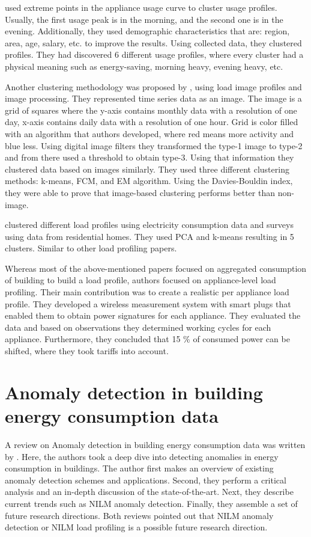 \cite{Jeong2021} used extreme points in the appliance usage curve to cluster usage profiles.
Usually, the first usage peak is in the morning, and the second one is in the evening. 
Additionally, they used demographic characteristics that are: region, area, age, salary, etc. to improve the results.
Using collected data, they clustered profiles. They had discovered 6 different usage profiles, 
where every cluster had a physical meaning such as energy-saving, morning heavy, evening heavy, etc.

Another clustering methodology was proposed by \cite{Park2019}, using load image profiles and image processing.
They represented time series data as an image. The image is a grid of squares where the y-axis contains monthly data with a resolution of one day,
x-axis contains daily data with a resolution of one hour. Grid is color filled with an algorithm that authors developed,
where red means more activity and blue less. Using digital image filters they transformed the type-1 image to type-2 and from there
used a threshold to obtain type-3. Using that information they clustered data based on images similarly. They used three different 
clustering methods: k-means, FCM, and EM algorithm. Using the Davies-Bouldin index, they were able to prove that image-based clustering performs better than non-image.

\cite{Joana2012} clustered different load profiles using electricity consumption data and surveys using data from residential homes.
They used PCA and k-means resulting in 5 clusters. Similar to other load profiling papers. 

Whereas most of the above-mentioned papers focused on aggregated consumption of building to build a load profile,
authors \cite{Issi2018} focused on appliance-level load profiling.
Their main contribution was to create a realistic per appliance load profile.
They developed a wireless measurement system with smart plugs that enabled them to obtain 
power signatures for each appliance. They evaluated the data and based on observations they determined working cycles for each appliance.
Furthermore, they concluded that 15 \% of consumed power can be shifted, where they took tariffs into account. 

\section{Anomaly detection in building energy consumption data}

A review on Anomaly detection in building energy consumption data was written by \cite{HIMEUR2021116601}.
Here, the authors took a deep dive into detecting anomalies in energy consumption in buildings. 
The author first makes an overview of existing anomaly detection schemes and applications.
Second, they perform a critical analysis and an in-depth discussion of the state-of-the-art.
Next, they describe current trends such as NILM anomaly detection. Finally, they assemble a set of future research directions. 
Both reviews pointed out that NILM anomaly detection or NILM load profiling is a possible future research direction.

